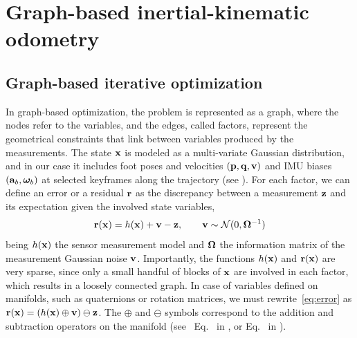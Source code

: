
\section{Graph-based inertial-kinematic odometry}


\subsection{Graph-based iterative optimization}

In graph-based optimization, the problem is represented as a graph, where the nodes refer to the variables, and the edges, called factors, represent the geometrical constraints that link between variables produced by the measurements.
%
The state ${\bf x}$ is modeled as a multi-variate Gaussian distribution, and in our case it includes foot poses and velocities $({\bf p},{\bf q},{\bf v})$ and IMU biases $({\bf a}_b,{{\bm \omega}}_b)$ at selected keyframes along the trajectory (see ).
%
For each factor, we can define an error or a residual ${\bf r}$ as the discrepancy between a measurement ${\bf z}$ and its expectation given the involved state variables,
%
\begin{equation}
    {\bf r}({\bf x}) = h({\bf x}) + {\bf v} - {\bf z}, \qquad {\bf v} \sim \mathcal {\mathcal{N}} (0, {\bm \Omega}^{-1})\label{eq:error}
\end{equation}
%
being $h({\bf x})$ the sensor measurement model and ${\bm \Omega}$ the information matrix of the measurement Gaussian noise ${\bf v}$.
Importantly, the functions $h({\bf x})$ and ${\bf r}({\bf x})$ are very sparse, since only a small handful of blocks of ${\bf x}$ are involved in each factor, which results in a loosely connected graph.
In case of variables defined on manifolds, such as quaternions or rotation matrices, we must rewrite~\eqref{eq:error} as \mbox{${\bf r}({\bf x}) = (h({\bf x}) \oplus {\bf v}) \ominus {\bf z}$}.
The $\oplus$ and $\ominus$ symbols correspond to the addition and subtraction operators on the manifold
(see \eg~Eq.~ in , or Eq.~ in ).

